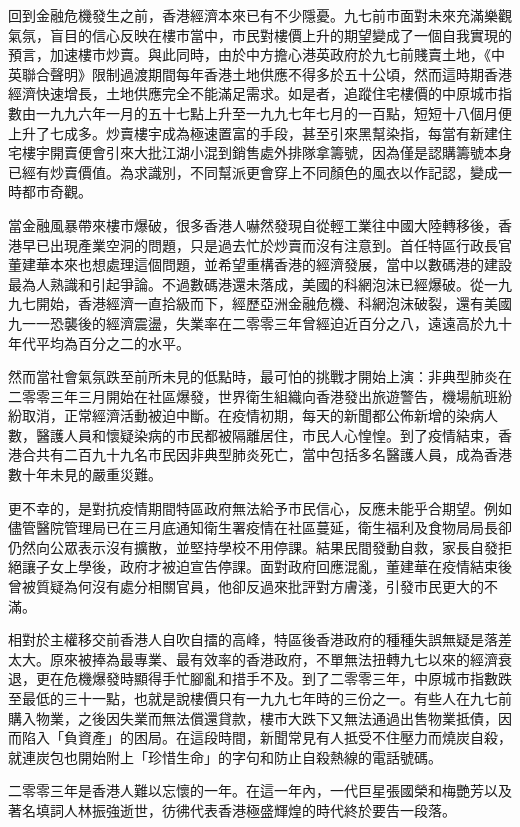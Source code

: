 回到金融危機發生之前，香港經濟本來已有不少隱憂。九七前市面對未來充滿樂觀氣氛，盲目的信心反映在樓市當中，市民對樓價上升的期望變成了一個自我實現的預言，加速樓市炒賣。與此同時，由於中方擔心港英政府於九七前賤賣土地，《中英聯合聲明》限制過渡期間每年香港土地供應不得多於五十公頃，然而這時期香港經濟快速增長，土地供應完全不能滿足需求。如是者，追蹤住宅樓價的中原城市指數由一九九六年一月的五十七點上升至一九九七年七月的一百點，短短十八個月便上升了七成多。炒賣樓宇成為極速置富的手段，甚至引來黑幫染指，每當有新建住宅樓宇開賣便會引來大批江湖小混到銷售處外排隊拿籌號，因為僅是認購籌號本身已經有炒賣價值。為求識別，不同幫派更會穿上不同顏色的風衣以作記認，變成一時都市奇觀。

當金融風暴帶來樓市爆破，很多香港人嚇然發現自從輕工業往中國大陸轉移後，香港早已出現產業空洞的問題，只是過去忙於炒賣而沒有注意到。首任特區行政長官董建華本來也想處理這個問題，並希望重構香港的經濟發展，當中以數碼港的建設最為人熟識和引起爭論。不過數碼港還未落成，美國的科網泡沫已經爆破。從一九九七開始，香港經濟一直拾級而下，經歷亞洲金融危機、科網泡沫破裂，還有美國九一一恐襲後的經濟震盪，失業率在二零零三年曾經迫近百分之八，遠遠高於九十年代平均為百分之二的水平。

然而當社會氣氛跌至前所未見的低點時，最可怕的挑戰才開始上演：非典型肺炎在二零零三年三月開始在社區爆發，世界衛生組織向香港發出旅遊警告，機場航班紛紛取消，正常經濟活動被迫中斷。在疫情初期，每天的新聞都公佈新增的染病人數，醫護人員和懷疑染病的市民都被隔離居住，市民人心惶惶。到了疫情結束，香港合共有二百九十九名市民因非典型肺炎死亡，當中包括多名醫護人員，成為香港數十年未見的嚴重災難。

更不幸的，是對抗疫情期間特區政府無法給予市民信心，反應未能乎合期望。例如儘管醫院管理局已在三月底通知衛生署疫情在社區蔓延，衛生福利及食物局局長卻仍然向公眾表示沒有擴散，並堅持學校不用停課。結果民間發動自救，家長自發拒絕讓子女上學後，政府才被迫宣告停課。面對政府回應混亂，董建華在疫情結束後曾被質疑為何沒有處分相關官員，他卻反過來批評對方膚淺，引發市民更大的不滿。

相對於主權移交前香港人自吹自擂的高峰，特區後香港政府的種種失誤無疑是落差太大。原來被捧為最專業、最有效率的香港政府，不單無法扭轉九七以來的經濟衰退，更在危機爆發時顯得手忙腳亂和措手不及。到了二零零三年，中原城市指數跌至最低的三十一點，也就是說樓價只有一九九七年時的三份之一。有些人在九七前購入物業，之後因失業而無法償還貸款，樓市大跌下又無法通過出售物業抵債，因而陷入「負資產」的困局。在這段時間，新聞常見有人抵受不住壓力而燒炭自殺，就連炭包也開始附上「珍惜生命」的字句和防止自殺熱線的電話號碼。

二零零三年是香港人難以忘懷的一年。在這一年內，一代巨星張國榮和梅艷芳以及著名填詞人林振強逝世，彷彿代表香港極盛輝煌的時代終於要告一段落。


